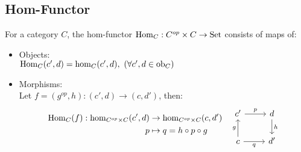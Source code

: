 \subsection{Hom-Functor}
\begin{definition}
  For a category $C$, the hom-functor $\mathrm{Hom}_C : C^{op}\times C \to
  \mathrm{Set}$ consists of maps of: \parencite{lane:working_mathematician}
  \begin{itemize}
    \item Objects:\\
      $\mathrm{Hom}_C (c', d) = \hom_C (c', d),
        \ (\forall c', d\in \mathrm{ob}_C)$
    \item Morphisms:\\
      Let $f=(g^{op}, h): (c', d)\to (c, d')$, then:
      \[
        \begin{aligned}
          \Hom_C (f) : \hom_{C^{op}\times C}(c', d) &\to
            \hom_{C^{op}\times C}(c, d')\\
          p &\mapsto q = h\circ p\circ g
        \end{aligned}\quad
        \begin{tikzcd}
        {c'} & d \\
        c & {d'}
        \arrow["g", from=2-1, to=1-1]
        \arrow["h", from=1-2, to=2-2]
        \arrow["p", from=1-1, to=1-2]
        \arrow["q"', from=2-1, to=2-2]
        \end{tikzcd}
      \]
  \end{itemize}
\end{definition}
